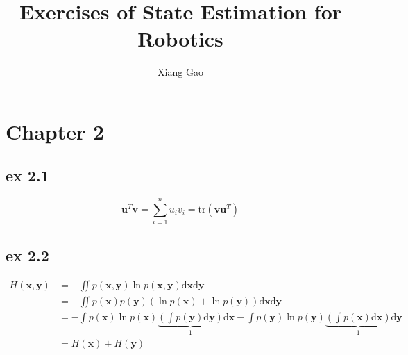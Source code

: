 \documentclass[10pt]{article}
\title{Exercises of State Estimation for Robotics}
\author{Xiang Gao}
\begin{document}
\maketitle

\section{Chapter 2}
\subsection{ex 2.1}
\begin{equation}
{\mathbf{u}^T}\mathbf{v} = \sum\limits_{i = 1}^n {{u_i}{v_i}}  = \mathrm{tr}\left( {\mathbf{v}{\mathbf{u}^T}} \right)
\end{equation}

\subsection{ex 2.2}
\begin{equation}
\begin{split}
H\left( {\mathbf{x},\mathbf{y}} \right) &=  - \iint {p\left( {\mathbf{x},\mathbf{y}} \right)\ln }p\left( {\mathbf{x},\mathbf{y}} \right)\mathrm{d}\mathbf{x}\mathrm{d}\mathbf{y} \\ 
&=  - \iint {p\left( \mathbf{x} \right)p\left( \mathbf{y} \right)\left( {\ln p\left( \mathbf{x} \right) + \ln p\left( \mathbf{y} \right)} \right)\mathrm{d}\mathbf{x}\mathrm{d}\mathbf{y}} \\ 
&=  - \int {p\left( \mathbf{x} \right)\ln p\left( \mathbf{x} \right)\underbrace {\left( {\int {p\left( \mathbf{y} \right)\mathrm{d}\mathbf{y}} } \right)}_1\mathrm{d}\mathbf{x} - \int {p\left( \mathbf{y} \right)\ln p\left( \mathbf{y} \right)\underbrace {\left( {\int {p\left( \mathbf{x} \right)\mathrm{d}\mathbf{x}} } \right)}_1\mathrm{d}\mathbf{y}} }  \\ 
&= H\left( \mathbf{x} \right) + H\left( \mathbf{y} \right) \\ 
\end{split}
\end{equation}
\end{document}
